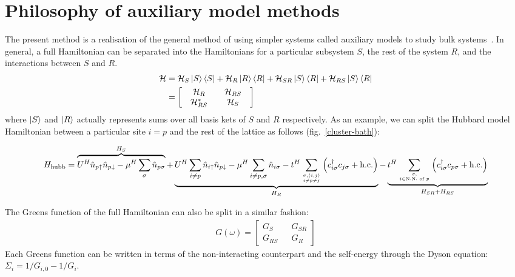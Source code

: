 \documentclass[reprint,hidelinks]{revtex4-2}
\begin{document}
\section{Philosophy of auxiliary model methods}
The present method is a realisation of the general method of using simpler systems called auxiliary models to study bulk systems~\cite{martin_2016}. In general, a full Hamiltonian can be separated into the Hamiltonians for a particular subsystem \(S\), the rest of the system \(R\), and the interactions between \(S\) and \(R\).
\begin{equation}\begin{aligned}
	\mathcal{H} &= \mathcal{H}_S\ket{S}\bra{S} + \mathcal{H}_R \ket{R}\bra{R} + \mathcal{H}_{SR} \ket{S}\bra{R} + \mathcal{H}_{RS}\ket{S}\bra{R} \\
		    &= \begin{bmatrix} & \mathcal{H}_{R} && \mathcal{H}_{RS} & \\ & \mathcal{H}_{RS}^* && \mathcal{H}_{S} & \end{bmatrix}
\end{aligned}\end{equation}
where \(\ket{S}\) and \(\ket{R}\) actually represents sums over all basis kets of \(S\) and \(R\) respectively. As an example, we can split the Hubbard model Hamiltonian between a particular site \(i = p\) and the rest of the lattice as follows (fig.~\ref{cluster-bath}):
\begin{widetext}
\begin{equation}\begin{aligned}
	H_\text{hubb} &= \overbrace{U^H\hat n_{p \uparrow} \hat n_{p \downarrow} - \mu^H \sum_\sigma \hat n_{p \sigma}}^{H_S} + \underbrace{U^H\sum_{i \neq p}\hat n_{i \uparrow} \hat n_{p \downarrow} - \mu^H \sum_{i \neq p, \sigma} \hat n_{i \sigma} -t^H\sum_{\sigma,\left<i,j \right>\atop{i \neq p \neq j}}\left(c^\dagger_{i\sigma} c_{j\sigma} + \text{h.c.}\right)}_{H_R} -\underbrace{t^H\sum_{\sigma,\atop{i \in \text{N.N. of }p}}\left(c^\dagger_{i\sigma} c_{p\sigma} + \text{h.c.}\right)}_{H_{SR} + H_{RS}}\\
\end{aligned}\end{equation}
\end{widetext}
The Greens function of the full Hamiltonian can also be split in a similar fashion:
\begin{equation}\begin{aligned}
	G(\omega) = \begin{bmatrix} G_S && G_{SR} \\ G_{RS} && G_R \end{bmatrix}
\end{aligned}\end{equation}
Each Greens function can be written in terms of the non-interacting counterpart and the self-energy through the Dyson equation: \(\Sigma_i = 1/G_{i,0} - 1/G_i\).
\end{document}
